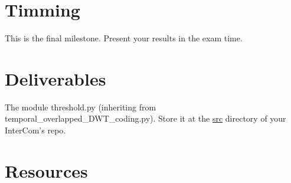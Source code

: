\section{Timming}

This is the final milestone. Present your results in the exam time.

\section{Deliverables}

The module threshold.py (inheriting from temporal\_overlapped\_DWT\_coding.py). Store it at the
\href{https://github.com/Tecnologias-multimedia/intercom/src}{src}
  directory of your InterCom's repo.

\section{Resources}



